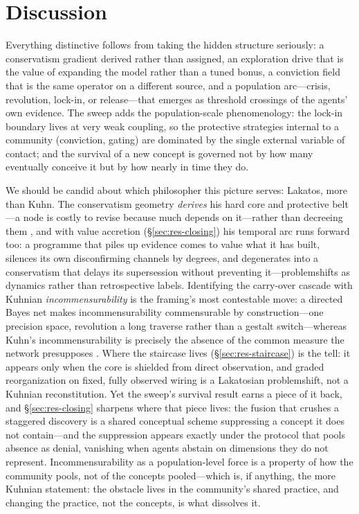 \documentclass[11pt]{article}
\begin{document}
\section{Discussion}
\label{sec:discussion}

Everything distinctive follows from taking the hidden structure seriously: a conservatism gradient
derived rather than assigned, an exploration drive that is the value of expanding the model rather
than a tuned bonus, a conviction field that is the same operator on a different source, and a
population arc---crisis, revolution, lock-in, or release---that emerges as threshold crossings of the
agents' own evidence. The sweep adds the population-scale phenomenology: the lock-in boundary lives
at very weak coupling, so the protective strategies internal to a community (conviction, gating) are
dominated by the single external variable of contact; and the survival of a new concept is governed
not by how many eventually conceive it but by how nearly in time they do.

We should be candid about which philosopher this picture serves: Lakatos, more than Kuhn. The
conservatism geometry \emph{derives} his hard core and protective belt---a node is costly to revise
because much depends on it---rather than decreeing them \citep{lakatos1970}, and with value
accretion (\S\ref{sec:res-closing}) his temporal arc runs forward too: a programme that piles up
evidence comes to value what it has built, silences its own disconfirming channels by degrees, and
degenerates into a conservatism that delays its supersession without preventing it---problemshifts
as dynamics rather than retrospective labels. Identifying the
carry-over cascade with Kuhnian \emph{incommensurability} is the framing's most contestable move: a
directed Bayes net makes incommensurability commensurable by construction---one precision space,
revolution a long traverse rather than a gestalt switch---whereas Kuhn's incommensurability is
precisely the absence of the common measure the network presupposes \citep{kuhn1983}. Where the
staircase lives (\S\ref{sec:res-staircase}) is the tell: it appears only when the core is shielded
from direct observation, and graded reorganization on fixed, fully observed wiring is a Lakatosian
problemshift, not a Kuhnian reconstitution. Yet the sweep's survival result earns a piece of it
back, and \S\ref{sec:res-closing} sharpens where that piece lives: the fusion that crushes a
staggered discovery is a shared conceptual scheme suppressing a concept it does not contain---and
the suppression appears exactly under the protocol that pools absence as denial, vanishing when
agents abstain on dimensions they do not represent. Incommensurability as a population-level
force is a property of how the community pools, not of the concepts pooled---which is, if
anything, the more Kuhnian statement: the obstacle lives in the community's shared practice, and
changing the practice, not the concepts, is what dissolves it.
\end{document}
